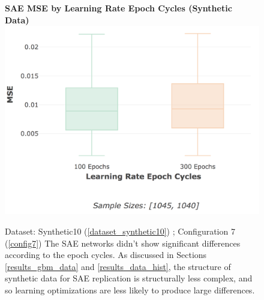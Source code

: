 \documentclass[a4paper,11pt,oneside]{article}
\theoremstyle{plain}
\theoremstyle{definition}
\begin{document}
		\begin{figure}[H]
		\centering 
		\textbf{SAE MSE by Learning Rate Epoch Cycles (Synthetic Data)}
		\includegraphics[scale=0.3]{images/results/8_appendix/synth_mse_lr_epochs.png} 
		\caption[SAE MSE by Learning Rate Epoch Cycles (Synthetic Data)]{Dataset: Synthetic10 (\ref{dataset_synthetic10}) ; Configuration 7 (\ref{config7})
			\newline The SAE networks didn't show significant differences according to the epoch cycles. As discussed in Sections \ref{results_gbm_data} and \ref{results_data_hist}, the structure of synthetic data for SAE replication is structurally less complex, and so learning optimizations are less likely to produce large differences.}
		\label{figure-synth_mse_lr_epochs}
		\end{figure}
	
\end{document}
